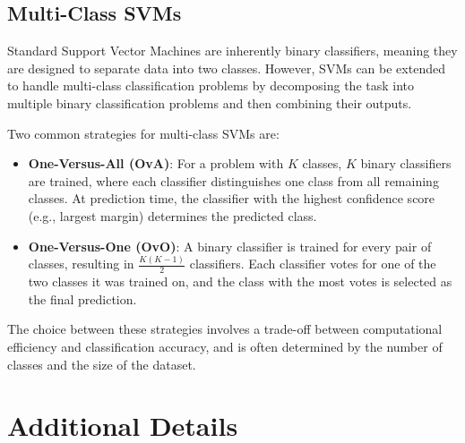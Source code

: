 \documentclass{article}
\begin{document}
\subsection{Multi-Class SVMs}
Standard Support Vector Machines are inherently binary classifiers, meaning they are designed to separate data into two classes. However, SVMs can be extended to handle multi-class classification problems by decomposing the task into multiple binary classification problems and then combining their outputs.

Two common strategies for multi-class SVMs are:
\begin{itemize}
\item \textbf{One-Versus-All (OvA)}: For a problem with \(K\) classes, \(K\) binary classifiers are trained, where each classifier distinguishes one class from all remaining classes. At prediction time, the classifier with the highest confidence score (e.g., largest margin) determines the predicted class.
\item \textbf{One-Versus-One (OvO)}: A binary classifier is trained for every pair of classes, resulting in \(\frac{K(K-1)}{2}\) classifiers. Each classifier votes for one of the two classes it was trained on, and the class with the most votes is selected as the final prediction.
\end{itemize}

The choice between these strategies involves a trade-off between computational efficiency and classification accuracy, and is often determined by the number of classes and the size of the dataset.

\section{Additional Details}
\end{document}
